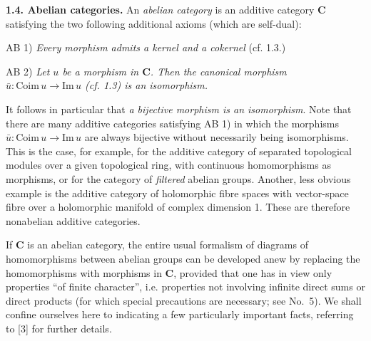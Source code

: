 
\noindent\textbf{1.4. Abelian categories.}
An \textit{abelian category} is an additive category $\mathbf{C}$ satisfying the two
following additional axioms (which are self-dual):

\noindent AB 1) \textit{Every morphism admits a kernel and a cokernel}
(cf. 1.3.)

\noindent AB 2) \textit{Let $u$ be a morphism in $\mathbf{C}$. Then the
canonical morphism
$\bar u:\mathrm{Coim}\,u\to\mathrm{Im}\,u$ \textup{(cf. 1.3)} is an
isomorphism.}

It follows in particular that \textit{a bijective morphism is an isomorphism}.
Note that there are many additive categories satisfying AB 1) in which the
morphisms $\bar u:\mathrm{Coim}\,u\to\mathrm{Im}\,u$ are always
bijective without necessarily being isomorphisms. This is the case, for
example, for the additive category of separated topological modules over a
given topological ring, with continuous homomorphisms as morphisms, or for the
category of \textit{filtered} abelian groups. Another, less obvious example is
the additive category of holomorphic fibre spaces with vector-space fibre over
a holomorphic manifold of complex dimension 1. These are therefore
nonabelian additive categories.

If $\mathbf{C}$ is an abelian category, the entire usual formalism of diagrams of
homomorphisms between abelian groups can be developed anew by replacing the
homomorphisms with morphisms in $\mathbf{C}$, provided that one has in view only
properties ``of finite character'', i.e. properties not involving infinite
direct sums or direct products (for which special precautions are necessary;
see No.~5). We shall confine ourselves here to indicating a few particularly
important facts, referring to [3] for further details.

